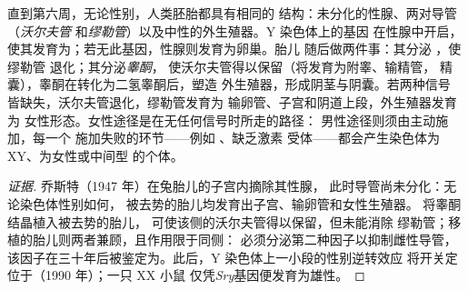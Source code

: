 \begin{proposition}[性别决定与分化]\label{prop:b2:mammal-reproduction:sex}
直到第六周，无论性别，人类胚胎都具有相同的
结构：未分化的性腺、两对导管（\emph{沃尔夫管}
和\emph{缪勒管}）以及中性的外生殖器。Y 染色体上的基因
\emph{}在性腺中开启，
使其发育为；若无此基因，性腺则发育为卵巢。胎儿
随后做两件事：其分泌
\emph{}，使缪勒管
退化；其分泌\emph{睾酮}，
使沃尔夫管得以保留（将发育为附睾、输精管，
精囊），睾酮在转化为二氢睾酮后，塑造
外生殖器，形成阴茎与阴囊。若两种信号
皆缺失，沃尔夫管退化，缪勒管发育为
输卵管、子宫和阴道上段，外生殖器发育为
女性形态。女性途径是在无任何信号时所走的路径：
男性途径则须由主动施加，每一个
施加失败的环节——例如  、缺乏激素
受体——都会产生染色体为 XY、为女性或中间型
的个体。
\end{proposition}
\begin{proof}[证据]
乔斯特（1947 年）在兔胎儿的子宫内摘除其性腺，
此时导管尚未分化：无论染色体性别如何，
被去势的胎儿均发育出子宫、输卵管和女性生殖器。
将睾酮结晶植入被去势的胎儿，
可使该侧的沃尔夫管得以保留，但未能消除
缪勒管；移植的胎儿则两者兼顾，且作用限于同侧：
必须分泌第二种因子以抑制雌性导管，
该因子在三十年后被鉴定为。此后，Y 染色体上一小段的性别逆转效应
将开关定位于\emph{}（1990 年）；一只 XX 小鼠
仅凭\emph{Sry}基因便发育为雄性。
\end{proof}

